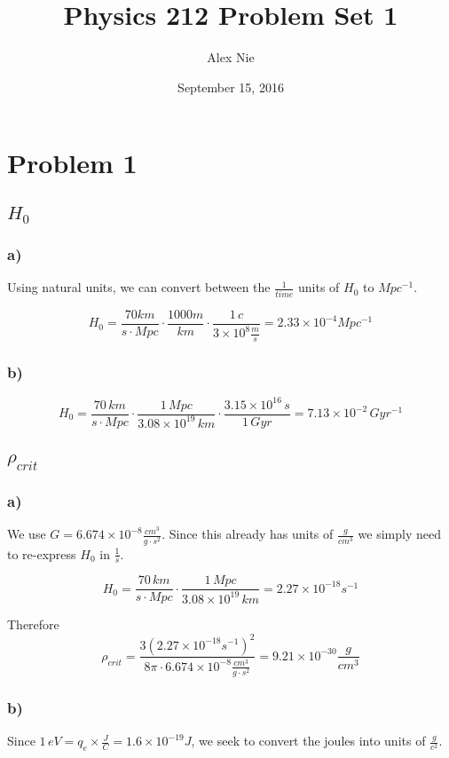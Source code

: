 \documentclass{article}
\title{Physics 212 Problem Set 1}
\author{Alex Nie}
\date{September 15, 2016}
\begin{document}
\maketitle

\section*{Problem 1}
\subsection*{$H_0$}
\subsubsection*{a)}
Using natural units, we can convert between the $\frac{1}{time}$ units of $H_0$ to $Mpc^{-1}$. 

\[H_0 = \frac{70 km}{s \cdot Mpc}\cdot\frac{1000m}{km}\cdot\frac{1\, c}{3\times 10^8\frac{m}{s}}=2.33\times 10^{-4}Mpc^{-1}\]

\subsubsection*{b)}
\[H_0 = \frac{70\,km}{s\cdot Mpc}\cdot\frac{1\,Mpc}{3.08\times 10^{19}\,km}\cdot\frac{3.15\times 10^{16}\,s}{1\,Gyr} = 7.13\times 10^{-2}\,Gyr^{-1}\]

\subsection*{$\rho_{crit}$}
\subsubsection*{a)}
We use $G=6.674\times10^{-8}\frac{cm^3}{g\cdot s^2}$. Since this already has units of $\frac{g}{cm^3}$ we simply need to re-express $H_0$ in $\frac{1}{s}$.

\[H_0 = \frac{70\,km}{s\cdot Mpc}\cdot\frac{1\,Mpc}{3.08\times 10^{19}\,km}=2.27\times 10^{-18}s^{-1}\]

Therefore
\[\rho_{crit} = \frac{3 (2.27\times 10^{-18}s^{-1})^2}{8\pi\cdot 6.674\times 10^{-8}\frac{cm^3}{g\cdot s^2}}=9.21\times 10^{-30}\frac{g}{cm^3}\]
\subsubsection*{b)}
Since $1\,eV = q_e \times \frac{J}{C} = 1.6\times 10^{-19} J$, we seek to convert the joules into units of $\frac{g}{c^2}$.
\end{document}
